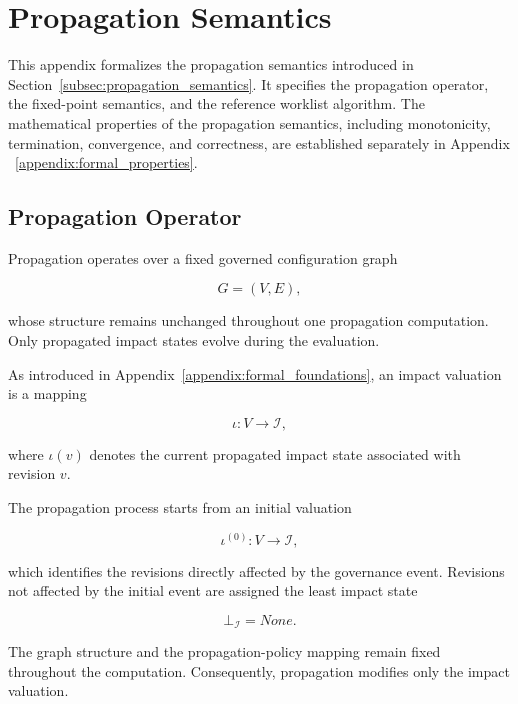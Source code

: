 \documentclass[10pt]{article}
\begin{document}
\section{Propagation Semantics}
\label{appendix:propagation_semantics}

This appendix formalizes the propagation semantics introduced in
Section~\ref{subsec:propagation_semantics}. It specifies the propagation
operator, the fixed-point semantics, and the reference worklist algorithm.
The mathematical properties of the propagation semantics, including monotonicity,
termination, convergence, and correctness, are established separately in
Appendix ~\ref{appendix:formal_properties}.

\subsection{Propagation Operator}

Propagation operates over a fixed governed configuration graph

\[
G=(V,E),
\]

whose structure remains unchanged throughout one propagation computation.
Only propagated impact states evolve during the evaluation.

As introduced in Appendix~\ref{appendix:formal_foundations}, an impact valuation
is a mapping

\[
\iota : V \rightarrow \mathcal{I},
\]

where $\iota(v)$ denotes the current propagated impact state associated with
revision $v$.

The propagation process starts from an initial valuation

\begin{equation}
	\iota^{(0)} : V \rightarrow \mathcal{I},
	\label{eq:initial_impact_valuation}
\end{equation}

which identifies the revisions directly affected by the governance event.
Revisions not affected by the initial event are assigned the least impact state

\[
\bot_{\mathcal I}=None.
\]

The graph structure and the propagation-policy mapping remain fixed throughout
the computation. Consequently, propagation modifies only the impact valuation.
\end{document}
